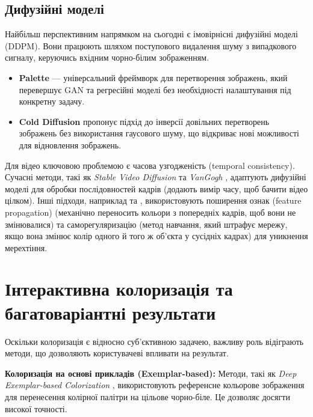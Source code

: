     \subsection{Дифузійні моделі}
        Найбільш перспективним напрямком на сьогодні є імовірнісні дифузійні моделі (DDPM).
        Вони працюють шляхом поступового видалення шуму з випадкового сигналу, керуючись вхідним чорно-білим зображенням.
        \begin{itemize}[label=$\bullet$]
            \item \textbf{Palette} \cite{2022-palette-image-to-image-diffusion-models} — універсальний фреймворк для перетворення зображень, який перевершує GAN та регресійні моделі без необхідності налаштування під конкретну задачу.
            \item \textbf{Cold Diffusion} \cite{2023-cold-diffusion} пропонує підхід до інверсії довільних перетворень зображень без використання гаусового шуму, що відкриває нові можливості для відновлення зображень.
        \end{itemize}

        Для відео ключовою проблемою є часова узгодженість (temporal consistency).
        Сучасні методи, такі як \textit{Stable Video Diffusion} \cite{2023-stable-video-diffusion} та \textit{VanGogh} \cite{2025-vangogh}, адаптують дифузійні моделі для обробки послідовностей кадрів (додають вимір часу, щоб бачити відео цілком).
        Інші підходи, наприклад \cite{2019-deep-exemplar-based-video-colorization} та \cite{2024-temporally-consistent-video-colorization}, використовують поширення ознак (feature propagation) (механічно переносить кольори з попередніх кадрів, щоб вони не змінювалися) та саморегуляризацію (метод навчання, який штрафує мережу, якщо вона змінює колір одного й того ж об'єкта у сусідніх кадрах) для уникнення мерехтіння.

\section{Інтерактивна колоризація та багатоваріантні результати}

    Оскільки колоризація є відносно суб'єктивною задачею, важливу роль відіграють методи, що дозволяють користувачеві впливати на результат.

    \textbf{Колоризація на основі прикладів (Exemplar-based):}
    Методи, такі як \textit{Deep Exemplar-based Colorization} \cite{2018-deep-exemplar-based-colorization}, використовують референсне кольорове зображення для перенесення колірної палітри на цільове чорно-біле.
    Це дозволяє досягти високої точності.

